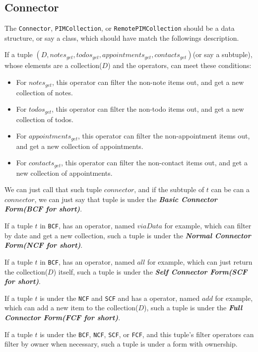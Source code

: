 \documentclass{article}
\begin{document}
   \subsection{Connector}
   The \lstinline|Connector|, \lstinline|PIMCollection|, or \lstinline|RemotePIMCollection| should be a data structure, or say a class,
   which should have match the followings description.

   If a tuple $(D,notes_{get},todos_{get},appointments_{get},contacts_{get})$(or say a subtuple), whose elements are a collection($D$) and the operators,
   can meet these conditions:
   \begin{itemize}
       \item For $notes_{get}$, this operator can filter the non-note items out, and get a new collection of notes.
       \item For $todos_{get}$, this operator can filter the non-todo items out, and get a new collection of todos.
       \item For $appointments_{get}$, this operator can filter the non-appointment items out, and get a new collection of appointments.
       \item For $contacts_{get}$, this operator can filter the non-contact items out, and get a new collection of appointments.
   \end{itemize}
   We can just call that such tuple $connector$, and if the subtuple of $t$ can be can a $connector$, we can just say that tuple
   is under the \textbf{\textit{Basic Connector Form(BCF for short)}}.

  If a tuple $t$ in \verb|BCF|, has an operator, named $viaData$ for example, which can filter by date and get a new collection,
  such a tuple is under the \textbf{\textit{Normal Connector Form(NCF for short)}}.

  If a tuple $t$ in \verb|BCF|, has an operator, named $all$ for example, which can just return the collection($D$) itself,
  such a tuple is under the \textbf{\textit{Self Connector Form(SCF for short)}}.

  If a tuple $t$ is under the \verb|NCF| and \verb|SCF| and has a operator, named $add$ for example, which can add a new item to the collection($D$),
  such a tuple is under the \textbf{\textit{Full Connector Form(FCF for short)}}.

  If a tuple $t$ is under the \verb|BCF|, \verb|NCF|, \verb|SCF|, or \verb|FCF|, and this tuple's filter operators can filter by owner when necessary,
  such a tuple is under a form with ownership.
\end{document}
